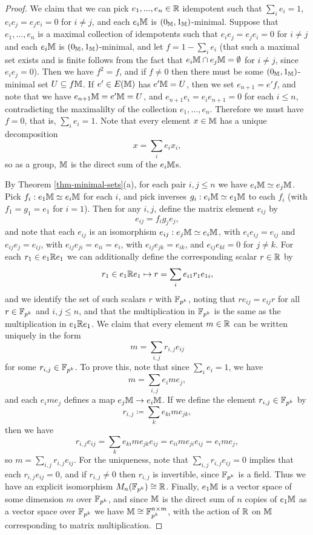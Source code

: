 \begin{appendices}
\begin{proof}
We claim that we can pick $e_1, ..., e_n \in \mathbb{R}$ idempotent such that $\sum_i e_i = 1$, $e_ie_j = e_je_i = 0$ for $i \ne j$, and each $e_i\mathbb{M}$ is $(0_{\mathbb{M}},1_{\mathbb{M}})$-minimal. Suppose that $e_1, ..., e_n$ is a maximal collection of idempotents such that $e_ie_j = e_je_i = 0$ for $i \ne j$ and each $e_i\mathbb{M}$ is $(0_{\mathbb{M}},1_{\mathbb{M}})$-minimal, and let $f = 1 - \sum_i e_i$ (that such a maximal set exists and is finite follows from the fact that $e_i\mathbb{M} \cap e_j\mathbb{M} = \emptyset$ for $i \ne j$, since $e_ie_j = 0$). Then we have $f^2 = f$, and if $f \ne 0$ then there must be some $(0_{\mathbb{M}},1_{\mathbb{M}})$-minimal set $U \subseteq f\mathbb{M}$. If $e' \in E(\mathbb{M})$ has $e'\mathbb{M} = U$, then we set $e_{n+1} = e'f$, and note that we have $e_{n+1}\mathbb{M} = e'\mathbb{M} = U$, and $e_{n+1}e_i = e_ie_{n+1} = 0$ for each $i \le n$, contradicting the maximalilty of the collection $e_1, ..., e_n$. Therefore we must have $f = 0$, that is, $\sum_i e_i = 1$. Note that every element $x \in \mathbb{M}$ has a unique decomposition
\[
x = \sum_i e_ix_i,
\]
so as a group, $\mathbb{M}$ is the direct sum of the $e_i\mathbb{M}$s.

By Theorem \ref{thm-minimal-sets}(a), for each pair $i,j \le n$ we have $e_i\mathbb{M} \simeq e_j\mathbb{M}$. Pick $f_i : e_1\mathbb{M} \simeq e_i\mathbb{M}$ for each $i$, and pick inverses $g_i : e_i\mathbb{M} \simeq e_1\mathbb{M}$ to each $f_i$ (with $f_1 = g_1 = e_1$ for $i = 1$). Then for any $i,j$, define the matrix element $e_{ij}$ by
\[
e_{ij} = f_ig_je_j,
\]
and note that each $e_{ij}$ is an isomorphism $e_{ij} : e_j\mathbb{M} \simeq e_i\mathbb{M}$, with $e_ie_{ij} = e_{ij}$ and $e_{ij}e_j = e_{ij}$, with $e_{ij}e_{ji} = e_{ii} = e_i$, with $e_{ij}e_{jk} = e_{ik}$, and $e_{ij}e_{kl} = 0$ for $j \ne k$.
For each $r_1 \in e_1\mathbb{R} e_1$ we can additionally define the corresponding scalar $r \in \mathbb{R}$ by
\[
r_1 \in e_1\mathbb{R} e_1 \mapsto r = \sum_i e_{i1}r_1e_{1i},
\]
and we identify the set of such scalars $r$ with $\mathbb{F}_{p^k}$, noting that $re_{ij} = e_{ij}r$ for all $r \in \mathbb{F}_{p^k}$ and $i,j \le n$, and that the multiplication in $\mathbb{F}_{p^k}$ is the same as the multiplication in $e_1\mathbb{R} e_1$. We claim that every element $m \in \mathbb{R}$ can be written uniquely in the form
\[
m = \sum_{i,j} r_{i,j}e_{ij}
\]
for some $r_{i,j} \in \mathbb{F}_{p^k}$. To prove this, note that since $\sum_i e_i = 1$, we have
\[
m = \sum_{i,j} e_ime_j,
\]
and each $e_ime_j$ defines a map $e_j\mathbb{M} \rightarrow e_i\mathbb{M}$. If we define the element $r_{i,j} \in \mathbb{F}_{p^k}$ by
\[
r_{i,j} \coloneqq \sum_k e_{ki}me_{jk},
\]
then we have
\[
r_{i,j}e_{ij} = \sum_k e_{ki}me_{jk}e_{ij} = e_{ii}me_{ji}e_{ij} = e_ime_j,
\]
so $m = \sum_{i,j} r_{i,j}e_{ij}$. For the uniqueness, note that $\sum_{i,j} r_{i,j}e_{ij} = 0$ implies that each $r_{i,j}e_{ij} = 0$, and if $r_{i,j} \ne 0$ then $r_{i,j}$ is invertible, since $\mathbb{F}_{p^k}$ is a field. Thus we have an explicit isomorphism $M_n(\mathbb{F}_{p^k}) \cong \mathbb{R}$. Finally, $e_1\mathbb{M}$ is a vector space of some dimension $m$ over $\mathbb{F}_{p^k}$, and since $\mathbb{M}$ is the direct sum of $n$ copies of $e_1\mathbb{M}$ as a vector space over $\mathbb{F}_{p^k}$ we have $\mathbb{M} \cong \mathbb{F}_{p^k}^{n\times m}$, with the action of $\mathbb{R}$ on $\mathbb{M}$ corresponding to matrix multiplication.
\end{proof}


\end{appendices}
